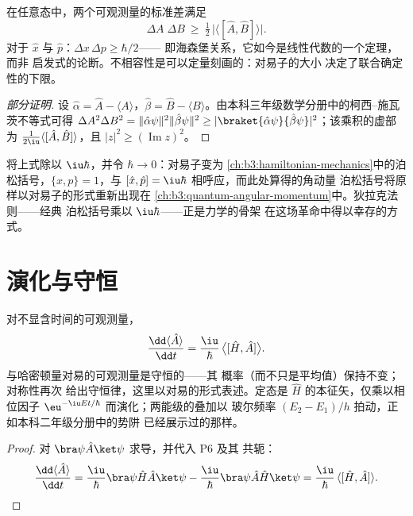 \begin{theorem}[一般的不确定性关系]\label{thm:b3:quantum-formalism:uncertainty}
在任意态中，两个可观测量的标准差满足
\[
\Delta A\;\Delta B \ \ge\ \tfrac12\,\big|\langle[\hat A, \hat
B]\rangle\big| .
\]
对于 $\hat x$ 与 $\hat p$：$\Delta x\,\Delta p \ge \hbar/2$——
即海森堡关系，它如今是线性代数的一个定理，而非
启发式的论断。不相容性是可以定量刻画的：对易子的大小
决定了联合确定性的下限。
\end{theorem}

\begin{proof}[部分证明]
设 $\hat\alpha = \hat A - \langle A\rangle$，$\hat\beta = \hat B -
\langle B\rangle$。由本科三年级数学分册中的柯西–施瓦茨不等式可得
$\Delta A^2\Delta B^2 =
\|\hat\alpha\psi\|^2\|\hat\beta\psi\|^2 \ge
|\braket{\hat\alpha\psi}{\hat\beta\psi}|^2$；该乘积的虚部为
$\tfrac1{2\iu}\langle[\hat A, \hat B]\rangle$，且
$|z|^2 \ge (\operatorname{Im}z)^2$。
\end{proof}

\begin{remark}[经典影子]\label{rem:b3:quantum-formalism:poisson}
将上式除以 $\iu\hbar$，并令 $\hbar \to 0$：对易子变为
\cref{ch:b3:hamiltonian-mechanics}中的泊松括号，$\{x, p\} =
1$，与 $[\hat x, \hat p] = \iu\hbar$ 相呼应，而此处算得的角动量
泊松括号将原样以对易子的形式重新出现在
\cref{ch:b3:quantum-angular-momentum}中。狄拉克法则——经典
泊松括号乘以 $\iu\hbar$——正是力学的骨架
在这场革命中得以幸存的方式。
\end{remark}

\section{演化与守恒}

\begin{proposition}\label{prop:b3:quantum-formalism:evolution}
对不显含时间的可观测量，
\[
\frac{\dd\langle\hat A\rangle}{\dd t}
 = \frac{\iu}{\hbar}\,\big\langle[\hat H, \hat A]\big\rangle .
\]
与哈密顿量对易的可观测量是守恒的——其
概率（而不只是平均值）保持不变；对称性再次
给出守恒律，这里以对易的形式表述。定态是
$\hat H$ 的本征矢，仅乘以相位因子
$\eu^{-\iu Et/\hbar}$ 而演化；两能级的叠加以
玻尔频率 $(E_2 - E_1)/h$ 拍动，正如本科二年级分册中的势阱
已经展示过的那样。
\end{proposition}

\begin{proof}
对 $\bra\psi\hat A\ket\psi$ 求导，并代入 P6 及其
共轭：
\[
\frac{\dd\langle\hat A\rangle}{\dd t}
 = \frac{\iu}{\hbar}\bra\psi\hat H\hat A\ket\psi
 - \frac{\iu}{\hbar}\bra\psi\hat A\hat H\ket\psi
 = \frac{\iu}{\hbar}\,\langle[\hat H, \hat A]\rangle .
\qedhere
\]
\end{proof}

